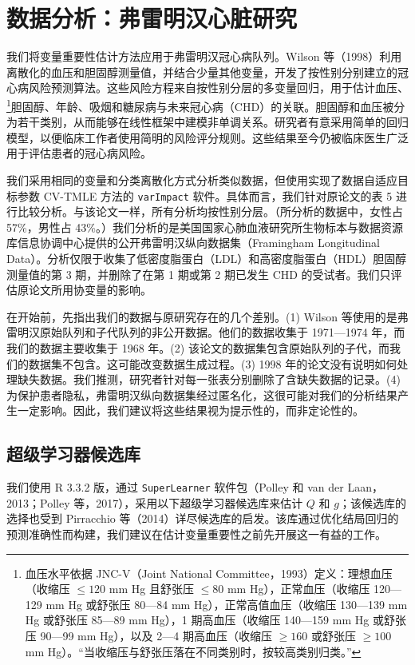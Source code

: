 \section{数据分析：弗雷明汉心脏研究}

我们将变量重要性估计方法应用于弗雷明汉冠心病队列。Wilson 等（1998）利用离散化的血压和胆固醇测量值，并结合少量其他变量，开发了按性别分别建立的冠心病风险预测算法。这些风险方程来自按性别分层的多变量回归，用于估计血压、\footnote{血压水平依据 JNC-V（Joint National Committee，1993）定义：理想血压（收缩压 $\leq120$ mm Hg 且舒张压 $\leq80$ mm Hg），正常血压（收缩压 120—129 mm Hg 或舒张压 80—84 mm Hg），正常高值血压（收缩压 130—139 mm Hg 或舒张压 85—89 mm Hg），1 期高血压（收缩压 140—159 mm Hg 或舒张压 90—99 mm Hg），以及 2—4 期高血压（收缩压 $\geq160$ 或舒张压 $\geq100$ mm Hg）。“当收缩压与舒张压落在不同类别时，按较高类别归类。”}胆固醇、年龄、吸烟和糖尿病与未来冠心病（CHD）的关联。胆固醇和血压被分为若干类别，从而能够在线性框架中建模非单调关系。研究者有意采用简单的回归模型，以便临床工作者使用简明的风险评分规则。这些结果至今仍被临床医生广泛用于评估患者的冠心病风险。

我们采用相同的变量和分类离散化方式分析类似数据，但使用实现了数据自适应目标参数 CV-TMLE 方法的 \texttt{varImpact} 软件。具体而言，我们针对原论文的表 5 进行比较分析。与该论文一样，所有分析均按性别分层。（所分析的数据中，女性占 57\%，男性占 43\%。）我们分析的是美国国家心肺血液研究所生物标本与数据资源库信息协调中心提供的公开弗雷明汉纵向数据集（Framingham Longitudinal Data）。分析仅限于收集了低密度脂蛋白（LDL）和高密度脂蛋白（HDL）胆固醇测量值的第 3 期，并删除了在第 1 期或第 2 期已发生 CHD 的受试者。我们只评估原论文所用协变量的影响。

在开始前，先指出我们的数据与原研究存在的几个差别。(1) Wilson 等使用的是弗雷明汉原始队列和子代队列的非公开数据。他们的数据收集于 1971—1974 年，而我们的数据主要收集于 1968 年。(2) 该论文的数据集包含原始队列的子代，而我们的数据集不包含。这可能改变数据生成过程。(3) 1998 年的论文没有说明如何处理缺失数据。我们推测，研究者针对每一张表分别删除了含缺失数据的记录。(4) 为保护患者隐私，弗雷明汉纵向数据集经过匿名化，这很可能对我们的分析结果产生一定影响。因此，我们建议将这些结果视为提示性的，而非定论性的。

\subsection{超级学习器候选库}

我们使用 R 3.3.2 版，通过 \texttt{SuperLearner} 软件包（Polley 和 van der Laan，2013；Polley 等，2017），采用以下超级学习器候选库来估计 $Q$ 和 $g$；该候选库的选择也受到 Pirracchio 等（2014）详尽候选库的启发。该库通过优化结局回归的预测准确性而构建，我们建议在估计变量重要性之前先开展这一有益的工作。

